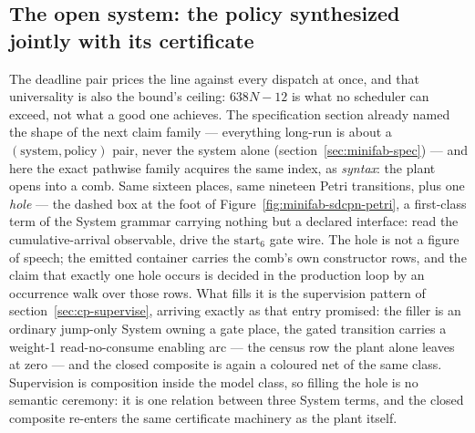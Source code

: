 \subsection{The open system: the policy synthesized jointly with
its certificate}
\label{sec:minifab-synthesis}

The deadline pair prices the line against every dispatch at once,
and that universality is also the bound's ceiling: $638N - 12$ is
what no scheduler can exceed, not what a good one achieves. The
specification section already named the shape of the next claim
family --- everything long-run is about a $(\text{system},
\text{policy})$ pair, never the system alone
(section~\ref{sec:minifab-spec}) --- and here the exact pathwise
family acquires the same index, as \emph{syntax}: the plant opens
into a comb. Same sixteen places, same nineteen Petri transitions,
plus one \emph{hole} --- the dashed box at the foot of
Figure~\ref{fig:minifab-sdcpn-petri}, a first-class term of the
System grammar carrying nothing but a declared interface: read the
cumulative-arrival observable, drive the $\mathrm{start}_6$ gate
wire. The hole is not a figure of speech; the emitted container
carries the comb's own constructor rows, and the claim that exactly
one hole occurs is decided in the production loop by an occurrence
walk over those rows. What fills it is the supervision pattern of
section~\ref{sec:cp-supervise}, arriving exactly as that entry
promised: the filler is an ordinary jump-only System owning a gate
place, the gated transition carries a weight-1 read-no-consume
enabling arc --- the census row the plant alone leaves at zero ---
and the closed composite is again a coloured net of the same class.
Supervision is composition inside the model class, so filling the
hole is no semantic ceremony: it is one relation between three
System terms, and the closed composite re-enters the same
certificate machinery as the plant itself.

